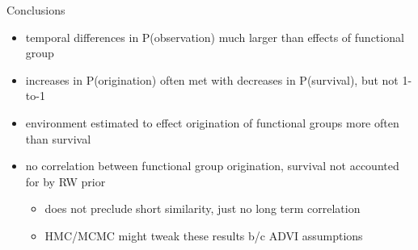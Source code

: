 \documentclass{beamer}
\begin{document}
\begin{frame}
  \begin{alertblock}{Conclusions}
    \begin{itemize}
      \item temporal differences in P(observation) much larger than effects of functional group
      \item increases in P(origination) often met with decreases in P(survival), but not 1-to-1
      \item environment estimated to effect origination of functional groups more often than survival
      \item no correlation between functional group origination, survival not accounted for by RW prior
        \begin{itemize}
          \item does not preclude short similarity, just no long term correlation
          \item HMC/MCMC might tweak these results b/c ADVI assumptions
        \end{itemize}
    \end{itemize}
  \end{alertblock}
\end{frame}
\end{document}
